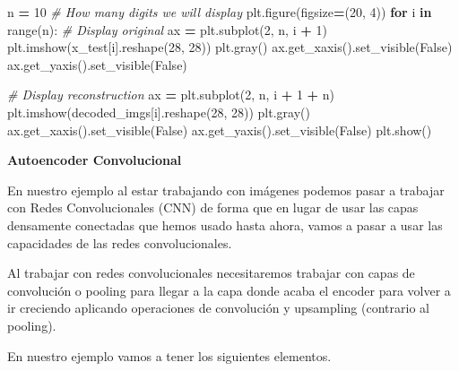 \documentclass[
  a4paper,
  DIV=11,
  numbers=noendperiod]{scrreprt}
\newenvironment{Shaded}{\begin{snugshade}}{\end{snugshade}}
\newcommand{\BuiltInTok}[1]{#1}
\newcommand{\CommentTok}[1]{\textcolor[rgb]{0.56,0.35,0.01}{\textit{#1}}}
\newcommand{\ControlFlowTok}[1]{\textcolor[rgb]{0.13,0.29,0.53}{\textbf{#1}}}
\newcommand{\DecValTok}[1]{\textcolor[rgb]{0.00,0.00,0.81}{#1}}
\newcommand{\KeywordTok}[1]{\textcolor[rgb]{0.13,0.29,0.53}{\textbf{#1}}}
\newcommand{\NormalTok}[1]{#1}
\newcommand{\OperatorTok}[1]{\textcolor[rgb]{0.81,0.36,0.00}{\textbf{#1}}}
\newcommand{\VariableTok}[1]{\textcolor[rgb]{0.00,0.00,0.00}{#1}}
\begin{document}
\begin{Shaded}
\begin{Highlighting}[numbers=left,,]
\NormalTok{n }\OperatorTok{=} \DecValTok{10}  \CommentTok{\# How many digits we will display}
\NormalTok{plt.figure(figsize}\OperatorTok{=}\NormalTok{(}\DecValTok{20}\NormalTok{, }\DecValTok{4}\NormalTok{))}
\ControlFlowTok{for}\NormalTok{ i }\KeywordTok{in} \BuiltInTok{range}\NormalTok{(n):}
    \CommentTok{\# Display original}
\NormalTok{    ax }\OperatorTok{=}\NormalTok{ plt.subplot(}\DecValTok{2}\NormalTok{, n, i }\OperatorTok{+} \DecValTok{1}\NormalTok{)}
\NormalTok{    plt.imshow(x\_test[i].reshape(}\DecValTok{28}\NormalTok{, }\DecValTok{28}\NormalTok{))}
\NormalTok{    plt.gray()}
\NormalTok{    ax.get\_xaxis().set\_visible(}\VariableTok{False}\NormalTok{)}
\NormalTok{    ax.get\_yaxis().set\_visible(}\VariableTok{False}\NormalTok{)}

    \CommentTok{\# Display reconstruction}
\NormalTok{    ax }\OperatorTok{=}\NormalTok{ plt.subplot(}\DecValTok{2}\NormalTok{, n, i }\OperatorTok{+} \DecValTok{1} \OperatorTok{+}\NormalTok{ n)}
\NormalTok{    plt.imshow(decoded\_imgs[i].reshape(}\DecValTok{28}\NormalTok{, }\DecValTok{28}\NormalTok{))}
\NormalTok{    plt.gray()}
\NormalTok{    ax.get\_xaxis().set\_visible(}\VariableTok{False}\NormalTok{)}
\NormalTok{    ax.get\_yaxis().set\_visible(}\VariableTok{False}\NormalTok{)}
\NormalTok{plt.show()}
\end{Highlighting}
\end{Shaded}

\textbf{Autoencoder Convolucional}

En nuestro ejemplo al estar trabajando con imágenes podemos pasar a
trabajar con Redes Convolucionales (CNN) de forma que en lugar de usar
las capas densamente conectadas que hemos usado hasta ahora, vamos a
pasar a usar las capacidades de las redes convolucionales.

Al trabajar con redes convolucionales necesitaremos trabajar con capas
de convolución o pooling para llegar a la capa donde acaba el encoder
para volver a ir creciendo aplicando operaciones de convolución y
upsampling (contrario al pooling).

En nuestro ejemplo vamos a tener los siguientes elementos.
\end{document}
